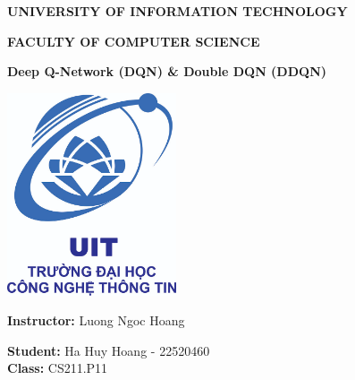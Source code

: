 \documentclass[english, a4paper,12pt]{article}
\date{}
\begin{document}
\begin{titlepage}
\begin{center}
\textbf{UNIVERSITY OF INFORMATION TECHNOLOGY}

\textbf{FACULTY OF COMPUTER SCIENCE}

\vspace{1cm}

\vspace{1cm}

\textbf{Deep Q-Network (DQN) \& Double DQN (DDQN)}

\vspace{2cm}
\includegraphics[width= 5cm]{logo.png}
\vspace{2cm}

\textbf{Instructor: } Luong Ngoc Hoang

\vspace{0.5cm}

\textbf{Student:} Ha Huy Hoang - 22520460
\vspace{0.5cm}
\\
\textbf{Class:} CS211.P11
\vspace{2cm}
\tableofcontents
\end{center}
\end{titlepage}
\end{document}
